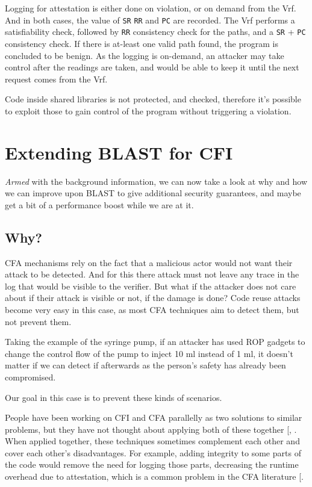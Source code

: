 \documentclass[a4paper, nobind]{templates/ociamthesis}
\begin{document}
Logging for attestation is either done on violation, or on demand from the Vrf. And in both cases,
the value of \texttt{SR} \texttt{RR} and \texttt{PC} are recorded. The Vrf performs a satisfiability check,
followed by \texttt{RR} consistency check for the paths, and a \texttt{SR} + \texttt{PC} consistency check.
If there is at-least one valid path found, the program is concluded to be benign.
As the logging is on-demand, an attacker may take control after the readings are taken,
and would be able to keep it until the next request comes from the Vrf.

Code inside shared libraries is not protected, and checked, therefore it's possible to
exploit those to gain control of the program without triggering a violation.

\chapter{Extending BLAST for CFI}\label{extending-blast-for-cfi}

\minitoc 

\emph{Armed} with the background information, we can now take a look at why and how we can improve
upon BLAST to give additional security guarantees, and maybe get a bit of a performance boost
while we are at it.

\section{Why?}\label{why-1}

CFA mechanisms rely on the fact that a malicious actor would not want their attack
to be detected. And for this there attack must not leave any trace in the log that
would be visible to the verifier. But what if the attacker does not care about if
their attack is visible or not, if the damage is done? Code reuse attacks become
very easy in this case, as most CFA techniques aim to detect them, but not prevent them.

Taking the example of the syringe pump, if an attacker has used ROP gadgets to
change the control flow of the pump to inject 10 ml instead of 1 ml, it doesn't
matter if we can detect if afterwards as the person's safety has already been compromised.

Our goal in this case is to prevent these kinds of scenarios.

People have been working on CFI and CFA parallelly as two solutions to similar
problems, but they have not thought about applying both of these together {[}, \citeproc{ref-sok}{5}{]}.
When applied together, these techniques sometimes complement each other and cover
each other's disadvantages. For example, adding integrity to some parts of the
code would remove the need for logging those parts, decreasing the runtime overhead
due to attestation, which is a common problem in the CFA literature {[}\citeproc{ref-sok}{5}{]}.
\end{document}
